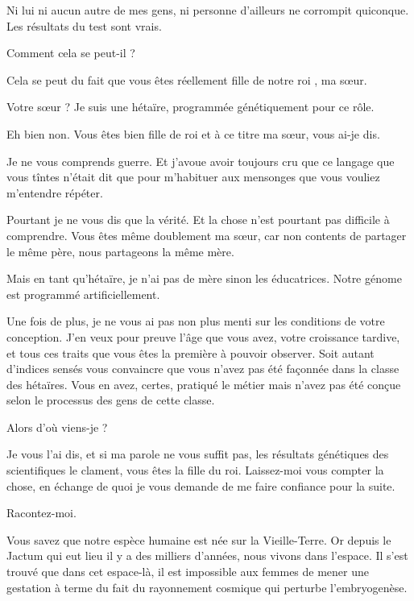\begin{drama}
   \elenaspeaks Ni lui ni aucun autre de mes gens, ni personne d’ailleurs ne corrompit quiconque. Les résultats du test sont vrais.

   \elaspeaks Comment cela se peut-il ?

   \elenaspeaks Cela se peut du fait que vous êtes réellement fille de notre roi \roi, ma sœur.

   \elaspeaks Votre sœur ? Je suis une hétaïre, programmée génétiquement pour ce rôle.

   \elenaspeaks Eh bien non. Vous êtes bien fille de roi et à ce titre ma sœur, vous ai-je dis.

   \elaspeaks Je ne vous comprends guerre. Et j’avoue avoir toujours cru que ce langage que vous tîntes n’était dit que pour m’habituer aux mensonges que vous vouliez m’entendre répéter.


   \elenaspeaks Pourtant je ne vous dis que la vérité. Et la chose n’est pourtant pas difficile à comprendre. Vous êtes même doublement ma sœur, car non contents de partager le même père, nous partageons la même mère.

   \elaspeaks Mais en tant qu’hétaïre, je n’ai pas de mère sinon les éducatrices. Notre génome est programmé artificiellement.

   \elenaspeaks Une fois de plus, je ne vous ai pas non plus menti sur les conditions de votre conception. J’en veux pour preuve l’âge que vous avez, votre croissance tardive, et tous ces traits que vous êtes la première à pouvoir observer. Soit autant d’indices sensés vous convaincre que vous n’avez pas été façonnée dans la classe des hétaïres. Vous en avez, certes, pratiqué le métier mais n’avez pas été conçue selon le processus des gens de cette classe.

   \elaspeaks Alors d’où viens-je ?

   \elenaspeaks Je vous l’ai dis, et si ma parole ne vous suffit pas, les résultats génétiques des scientifiques le clament, vous êtes la fille du roi. Laissez-moi vous compter la chose, en échange de quoi je vous demande de me faire confiance pour la suite.

   \elaspeaks Racontez-moi.

   \elenaspeaks Vous savez que notre espèce humaine est née sur la Vieille-Terre. Or depuis le Jactum qui eut lieu il y a des milliers d’années, nous vivons dans l’espace. Il s’est trouvé que dans cet espace-là, il est impossible aux femmes de mener une gestation à terme du fait du rayonnement cosmique qui perturbe l’embryogenèse.


\end{drama}
